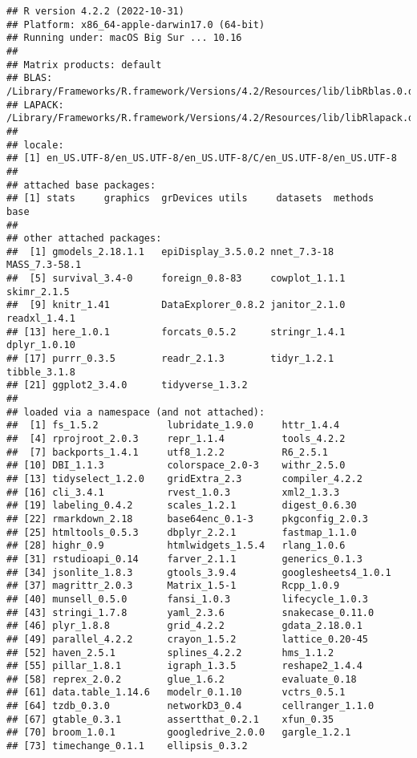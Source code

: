 \documentclass[
]{article}
\begin{document}
\begin{verbatim}
## R version 4.2.2 (2022-10-31)
## Platform: x86_64-apple-darwin17.0 (64-bit)
## Running under: macOS Big Sur ... 10.16
## 
## Matrix products: default
## BLAS:   /Library/Frameworks/R.framework/Versions/4.2/Resources/lib/libRblas.0.dylib
## LAPACK: /Library/Frameworks/R.framework/Versions/4.2/Resources/lib/libRlapack.dylib
## 
## locale:
## [1] en_US.UTF-8/en_US.UTF-8/en_US.UTF-8/C/en_US.UTF-8/en_US.UTF-8
## 
## attached base packages:
## [1] stats     graphics  grDevices utils     datasets  methods   base     
## 
## other attached packages:
##  [1] gmodels_2.18.1.1   epiDisplay_3.5.0.2 nnet_7.3-18        MASS_7.3-58.1     
##  [5] survival_3.4-0     foreign_0.8-83     cowplot_1.1.1      skimr_2.1.5       
##  [9] knitr_1.41         DataExplorer_0.8.2 janitor_2.1.0      readxl_1.4.1      
## [13] here_1.0.1         forcats_0.5.2      stringr_1.4.1      dplyr_1.0.10      
## [17] purrr_0.3.5        readr_2.1.3        tidyr_1.2.1        tibble_3.1.8      
## [21] ggplot2_3.4.0      tidyverse_1.3.2   
## 
## loaded via a namespace (and not attached):
##  [1] fs_1.5.2            lubridate_1.9.0     httr_1.4.4         
##  [4] rprojroot_2.0.3     repr_1.1.4          tools_4.2.2        
##  [7] backports_1.4.1     utf8_1.2.2          R6_2.5.1           
## [10] DBI_1.1.3           colorspace_2.0-3    withr_2.5.0        
## [13] tidyselect_1.2.0    gridExtra_2.3       compiler_4.2.2     
## [16] cli_3.4.1           rvest_1.0.3         xml2_1.3.3         
## [19] labeling_0.4.2      scales_1.2.1        digest_0.6.30      
## [22] rmarkdown_2.18      base64enc_0.1-3     pkgconfig_2.0.3    
## [25] htmltools_0.5.3     dbplyr_2.2.1        fastmap_1.1.0      
## [28] highr_0.9           htmlwidgets_1.5.4   rlang_1.0.6        
## [31] rstudioapi_0.14     farver_2.1.1        generics_0.1.3     
## [34] jsonlite_1.8.3      gtools_3.9.4        googlesheets4_1.0.1
## [37] magrittr_2.0.3      Matrix_1.5-1        Rcpp_1.0.9         
## [40] munsell_0.5.0       fansi_1.0.3         lifecycle_1.0.3    
## [43] stringi_1.7.8       yaml_2.3.6          snakecase_0.11.0   
## [46] plyr_1.8.8          grid_4.2.2          gdata_2.18.0.1     
## [49] parallel_4.2.2      crayon_1.5.2        lattice_0.20-45    
## [52] haven_2.5.1         splines_4.2.2       hms_1.1.2          
## [55] pillar_1.8.1        igraph_1.3.5        reshape2_1.4.4     
## [58] reprex_2.0.2        glue_1.6.2          evaluate_0.18      
## [61] data.table_1.14.6   modelr_0.1.10       vctrs_0.5.1        
## [64] tzdb_0.3.0          networkD3_0.4       cellranger_1.1.0   
## [67] gtable_0.3.1        assertthat_0.2.1    xfun_0.35          
## [70] broom_1.0.1         googledrive_2.0.0   gargle_1.2.1       
## [73] timechange_0.1.1    ellipsis_0.3.2
\end{verbatim}
\end{document}
